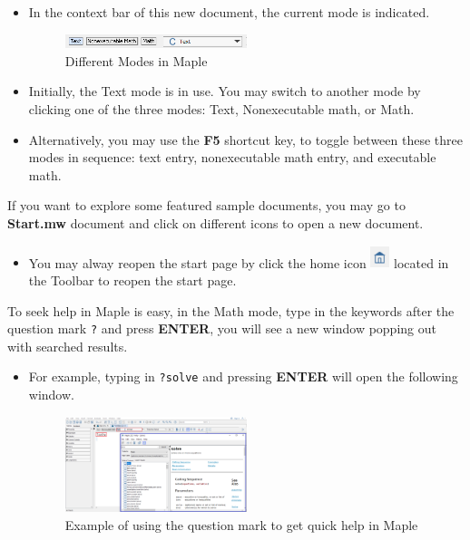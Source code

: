 \documentclass[
  12pt]{elegantbook}
\providecommand{\tightlist}{%
  \setlength{\itemsep}{0pt}\setlength{\parskip}{0pt}}
\begin{document}
\begin{itemize}
\item
  In the context bar of this new document, the current mode is indicated.

  \begin{figure}
  \centering
  \includegraphics[width=0.5\textwidth,height=\textheight]{figs/Maple-Modes.png}
  \caption{Different Modes in Maple}
  \end{figure}
\item
  Initially, the Text mode is in use. You may switch to another mode by clicking one of the three modes: Text, Nonexecutable math, or Math.
\item
  Alternatively, you may use the \textbf{F5} shortcut key, to toggle between these three modes in sequence: text entry, nonexecutable math entry, and executable math.
\end{itemize}

If you want to explore some featured sample documents, you may go to \textbf{Start.mw} document and click on different icons to open a new document.

\begin{itemize}
\tightlist
\item
  You may alway reopen the start page by click the home icon \includegraphics[width=1.5em,height=\textheight]{figs/Home-icon.png} located in the Toolbar to reopen the start page.
\end{itemize}

To seek help in Maple is easy, in the Math mode, type in the keywords after the question mark \texttt{?} and press \textbf{ENTER}, you will see a new window popping out with searched results.

\begin{itemize}
\item
  For example, typing in \texttt{?solve} and pressing \textbf{ENTER} will open the following window.

  \begin{figure}
  \centering
  \includegraphics[width=0.5\textwidth,height=\textheight]{figs/Maple-QuickHelp.png}
  \caption{Example of using the question mark to get quick help in Maple}
  \end{figure}
\end{itemize}
\end{document}
